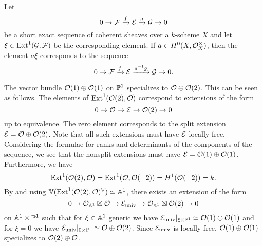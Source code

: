 \begin{remark} \label{rem:scalars-on-ext} Let
	\[ \sesarrows{\mc{F}}{f}{\mc{E}}{g}{\mc{G}} \]
	be a short exact sequence of coherent sheaves over a $k$-scheme $X$ and let $\xi \in \Ext^1(\mc{G},\mc{F})$ be the corresponding element. If $a \in H^0(X,\mc{O}^{\times}_X)$, then the element $a\xi$ corresponds to the sequence
	\[ \sesarrows{\mc{F}}{f}{\mc{E}}{a^{-1}g}{\mc{G}}.\]
\end{remark}

\begin{example}
	The vector bundle $\mc{O}(1)\oplus \mc{O}(1)$ on $\PP^1$ specializes to $\mc{O}\oplus \mc{O}(2)$.
	This can be seen as follows.
	The elements of $\Ext^1(\mc{O}(2),\mc{O})$ correspond to extensions of the form
	\[ \ses{\mc{O}}{\mc{E}}{\mc{O}(2)}\]
	up to equivalence. The zero element corresponds to the split extension $\mc{E} = \mc{O} \oplus \mc{O}(2)$.
	Note that all such extensions must have $\mc{E}$ locally free.
	Considering the formulae for ranks and determinants of the components of the sequence, we see that the nonsplit extensions must have
	$\mc{E}=\mc{O}(1)\oplus\mc{O}(1)$.
	Furthermore, we have \[\Ext^1(\mc{O}(2),\mc{O}) = \Ext^1(\mc{O},\mc{O}(-2))=H^1(\mc{O}(-2))=k.\]
	By  and using $\VV(\Ext^1(\mc{O}(2),\mc{O})\dual)\simeq \AA^1$, there exists an extension of the form
	\[\ses{\mc{O}_{\AA^1} \boxtimes \mc{O}}{\mc{E}_{\text{univ}}}{\mc{O}_{\AA^1}\boxtimes \mc{O}(2)}\]
	on $\AA^1\times \PP^1$
	such that for $\xi\in\AA^1$ generic we have
	$\mc{E}_{\text{univ}}|_{\xi \times \PP^1} \simeq \mc{O}(1)\oplus\mc{O}(1)$
	and for $\xi=0$ we have 
	$\mc{E}_{\text{univ}}|_{0\times \PP^1} \simeq \mc{O} \oplus \mc{O}(2)$.
	Since $\mc{E}_{\text{univ}}$ is locally free, $\mc{O}(1)\oplus \mc{O}(1)$ specializes to $\mc{O}(2)\oplus \mc{O}$.
\end{example}

